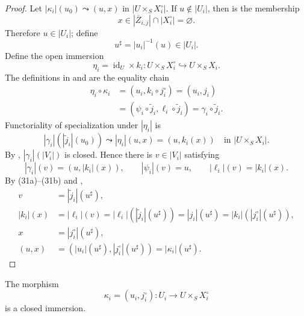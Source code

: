 \begin{proof}
  Let $|\kappa_i|(u_0)\leadsto(u,x)$ in $|U\times_SX_i^\circ|$.  If
  $u\notin|U_i|$, then
   is the membership
  \[
    x\in|\overline Z_{i,j}|\cap|X_i^\circ|=\varnothing.
  \]
  Therefore $u\in|U_i|$; define
  \[
    u^\sharp=|u_i|^{-1}(u)\in|U_i|.                               \tag{31a}
  \]
  Define the open immersion
  \[
    \eta_i=\operatorname{id}_U\times k_i\colon
      U\times_SX_i^\circ\hookrightarrow U\times_SX_i.
  \]
  The definitions in
   and
   are the equality chain
  \[
  \begin{aligned}
    \eta_i\circ\kappa_i
      &=(u_i,k_i\circ j_i^\circ)
       =(u_i,j_i)\\
      &=(\psi_i\circ\widetilde j_i,
          \ell_i\circ\widetilde j_i)
       =\gamma_i\circ\widetilde j_i.
  \end{aligned}
  \]
  Functoriality of specialization under $|\eta_i|$ is
  \[
    |\gamma_i|(|\widetilde j_i|(u_0))
      \leadsto|\eta_i|(u,x)
      =(u,k_i(x))
      \quad\text{in }|U\times_SX_i|.
  \]
  By ,
  $|\gamma_i|(|V_i|)$ is closed.  Hence there is $v\in|V_i|$ satisfying
  \[
    |\gamma_i|(v)=(u,|k_i|(x)),\qquad
    |\psi_i|(v)=u,\qquad
    |\ell_i|(v)=|k_i|(x).                                         \tag{31b}
  \]
  By (31a)--(31b) and
  ,
  \[
  \begin{aligned}
    v
      &=|\widetilde j_i|(u^\sharp),\\
    |k_i|(x)
      &=|\ell_i|(v)
       =|\ell_i|(|\widetilde j_i|(u^\sharp))
       =|j_i|(u^\sharp)
       =|k_i|(|j_i^\circ|(u^\sharp)),\\
    x&=|j_i^\circ|(u^\sharp),\\
    (u,x)
      &=(|u_i|(u^\sharp),|j_i^\circ|(u^\sharp))
       =|\kappa_i|(u^\sharp).
  \end{aligned}
  \]
\end{proof}

\begin{lemma}
  \label{lemma:nagata-intermediate-overlap-closed}
  \lean{}

  The morphism
  \[
    \kappa_i=(u_i,j_i^\circ)\colon U_i\to U\times_SX_i^\circ
  \]
  is a closed immersion.
\end{lemma}

